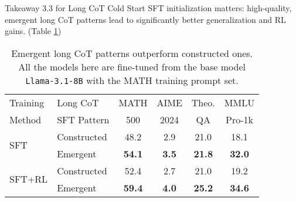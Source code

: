 \begin{AIbox}{Takeaway 3.3 for Long CoT Cold Start}
SFT initialization matters: high-quality, emergent long CoT patterns lead to significantly better generalization and RL gains. (Table \ref{tab:constructed-underperforms-emergent})
\end{AIbox}

\begin{table}[htbp]
\vspace{-15pt}
\caption{Emergent long CoT patterns outperform constructed ones. All the models here are fine-tuned from the base model \texttt{Llama-3.1-8B} with the MATH training prompt set.
}
\label{tab:constructed-underperforms-emergent}
\vskip 0.1in
\centering
\small
\begin{tabular}{@{}llcccc@{}}
\toprule
Training & Long CoT & MATH & AIME & Theo. & MMLU \\
Method & SFT Pattern & 500 & 2024 & QA & Pro-1k \\
\midrule
\multirow{2}{*}{SFT} & Constructed & 48.2 & 2.9 & 21.0 & 18.1 \\
& Emergent & \textbf{54.1} & \textbf{3.5} & \textbf{21.8} &\textbf{ 32.0} \\
\midrule
\multirow{2}{*}{SFT+RL} & Constructed & 52.4 & 2.7 & 21.0 & 19.2 \\
& Emergent & \textbf{59.4} & \textbf{4.0} & \textbf{25.2} & \textbf{34.6} \\
\bottomrule
\end{tabular}
\end{table}



